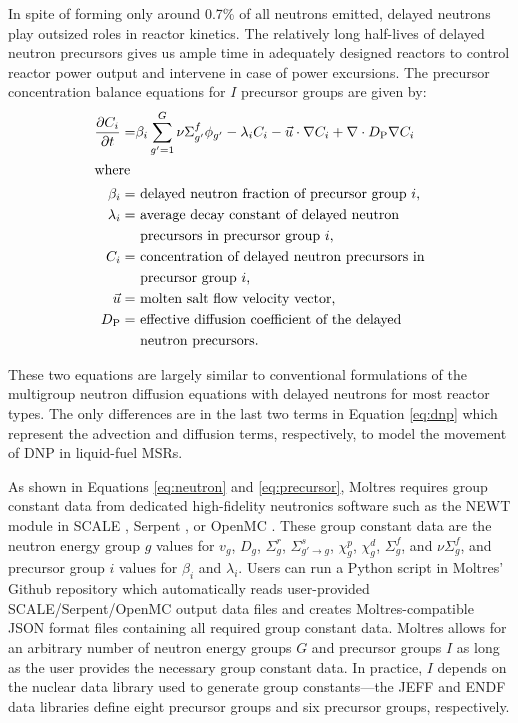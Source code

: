 In spite of forming only around 0.7\% of all neutrons emitted, delayed neutrons
play outsized roles in reactor kinetics. The relatively long half-lives of
delayed neutron precursors gives us ample time in adequately designed reactors
to control reactor power output and intervene in case of power excursions.
The precursor concentration balance equations for $I$ precursor
groups are given by:
%
\begin{align}
    \frac{\partial C_i}{\partial t} =& \beta_i \sum^G_{g'=1} \nu \Sigma^f_{g'}
    \phi_{g'} - \lambda_i C_i - \vec{u} \cdot \nabla C_i + \nabla \cdot
    D_{\text{P}} \nabla C_i \label{eq:precursor} \\
    \shortintertext{where}
    \beta_i =& \text{ delayed neutron fraction of precursor group $i$,}
    \nonumber \\
    \lambda_i =& \text{ average decay constant of delayed neutron} \nonumber \\
    &\text{ precursors in precursor group $i$,} \nonumber \\
    C_i =& \text{ concentration of delayed neutron precursors in}
    \nonumber \\
    &\text{ precursor group $i$,} \nonumber \\
    \vec{u} =& \text{ molten salt flow velocity vector,}
    \nonumber \\
    D_{\text{P}} =& \text{ effective diffusion coefficient of the delayed}
    \nonumber \\
    &\text{ neutron precursors.} \nonumber
\end{align}

These two equations are largely similar to conventional formulations of the
multigroup neutron diffusion equations with delayed neutrons for most reactor
types. The only differences are in the last two terms in Equation \ref{eq:dnp}
which represent the advection and diffusion terms, respectively, to model the
movement of \gls{DNP} in liquid-fuel \glspl{MSR}.

As shown in Equations \ref{eq:neutron} and \ref{eq:precursor}, Moltres requires
group constant data from dedicated high-fidelity neutronics software such as
the NEWT module in SCALE \cite{dehart_reactor_2011}, Serpent
\cite{leppanen_serpent_2014}, or OpenMC \cite{romano_openmc:_2015}. These group
constant data are the neutron energy group $g$ values for $v_g$, $D_g$,
$\Sigma^r_g$, $\Sigma^s_{g' \rightarrow g}$, $\chi^p_g$, $\chi^d_g$,
$\Sigma^f_{g}$, and $\nu\Sigma^f_{g}$, and precursor group $i$ values for
$\beta_i$ and $\lambda_i$. Users
can run a Python script in Moltres' Github repository which automatically reads
user-provided SCALE/Serpent/OpenMC output data files and creates
Moltres-compatible JSON format files containing all required group constant
data. Moltres allows for an arbitrary number of neutron energy groups $G$ and
precursor groups $I$ as long as the user provides the necessary group constant
data. In practice, $I$ depends on the nuclear data library used to generate
group constants---the JEFF \cite{plompen_joint_2020} and ENDF
\cite{brown_endfb-viii0_2018} data libraries define eight precursor groups
and six precursor groups, respectively.

